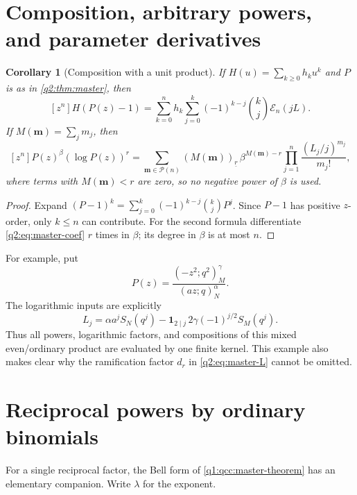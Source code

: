 \documentclass[11pt,a4paper,oneside,openany]{book}
\newtheorem{corollary}[theorem]{Corollary}
\theoremstyle{definition}
\theoremstyle{remark}
\newcommand{\poch}[3]{(#1;#2)_{#3}}
\newcommand{\Ecal}{\mathcal E}
\newcommand{\Pcal}{\mathcal P}
\begin{document}
\section{Composition, arbitrary powers, and parameter derivatives}
\begin{corollary}[Composition with a unit product]\label{q2:cor:compose-P}
If $H(u)=\sum_{k\ge0}h_ku^k$ and $P$ is as in \cref{q2:thm:master}, then
\begin{equation}\label{q2:eq:compose-P}
 [z^n]H(P(z)-1)
 =\sum_{k=0}^n h_k\sum_{j=0}^k(-1)^{k-j}\binom kj\Ecal_n(jL).
\end{equation}
If $M(\bm m)=\sum_jm_j$, then
\begin{equation}\label{q2:eq:beta-derivative}
 [z^n]P(z)^\beta(\log P(z))^r
 =\sum_{\bm m\in\Pcal(n)}
   (M(\bm m))_{\underline r}\,\beta^{M(\bm m)-r}
   \prod_{j=1}^n\frac{(L_j/j)^{m_j}}{m_j!},
\end{equation}
where terms with $M(\bm m)<r$ are zero, so no negative power of $\beta$ is used.
\end{corollary}
\begin{proof}
Expand $(P-1)^k=\sum_{j=0}^k(-1)^{k-j}\binom kjP^j$.
Since $P-1$ has positive $z$-order, only $k\le n$ can contribute.
For the second formula differentiate \eqref{q2:eq:master-coef} $r$ times in $\beta$;
its degree in $\beta$ is at most $n$.
\end{proof}

For example, put
\[
 P(z)=\frac{\poch{-z^2}{q^2}M^\gamma}{\poch{az}qN^\alpha}.
\]
The logarithmic inputs are explicitly
\begin{equation}\label{q2:eq:mixed-example-L}
 L_j=\alpha a^jS_N(q^j)
   -\mathbf1_{2\mid j}\,2\gamma(-1)^{j/2}S_M(q^j).
\end{equation}
Thus all powers, logarithmic factors, and compositions of this mixed even/ordinary
product are evaluated by one finite kernel. This example also makes clear why the
ramification factor $d_r$ in \eqref{q2:eq:master-L} cannot be omitted.

\section{Reciprocal powers by ordinary binomials}
For a single reciprocal factor, the Bell form of
\cref{q1:qcc:master-theorem} has an elementary companion. Write
\(\lambda\) for the exponent.
\end{document}
